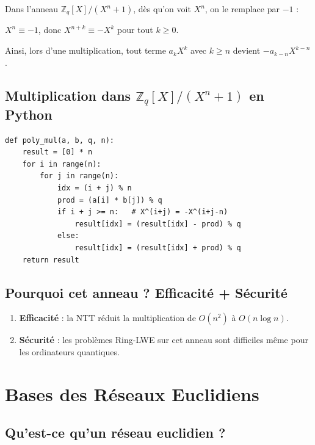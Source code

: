 \documentclass[11pt,a4paper]{article}
\begin{document}
Dans l'anneau $\mathbb{Z}_q[X]/(X^n+1)$, dès qu'on voit $X^n$, on le remplace par $-1$ :

\begin{infobox}
$X^n \equiv -1$, donc $X^{n+k} \equiv -X^k$ pour tout $k \geq 0$.
\end{infobox}

Ainsi, lors d'une multiplication, tout terme $a_k X^k$ avec $k \geq n$ devient $-a_{k-n} X^{k-n}$.

\subsection{Multiplication dans $\mathbb{Z}_q[X]/(X^n+1)$ en Python}

\begin{lstlisting}[style=python]
def poly_mul(a, b, q, n):
    result = [0] * n
    for i in range(n):
        for j in range(n):
            idx = (i + j) % n
            prod = (a[i] * b[j]) % q
            if i + j >= n:   # X^(i+j) = -X^(i+j-n)
                result[idx] = (result[idx] - prod) % q
            else:
                result[idx] = (result[idx] + prod) % q
    return result
\end{lstlisting}

\subsection{Pourquoi cet anneau ? Efficacité + Sécurité}

\begin{enumerate}
  \item \textbf{Efficacité} : la NTT réduit la multiplication de $O(n^2)$ à $O(n \log n)$.
  \item \textbf{Sécurité} : les problèmes Ring-LWE sur cet anneau sont difficiles même pour les ordinateurs quantiques.
\end{enumerate}

\section{Bases des Réseaux Euclidiens}

\subsection{Qu'est-ce qu'un réseau euclidien ?}
\end{document}

